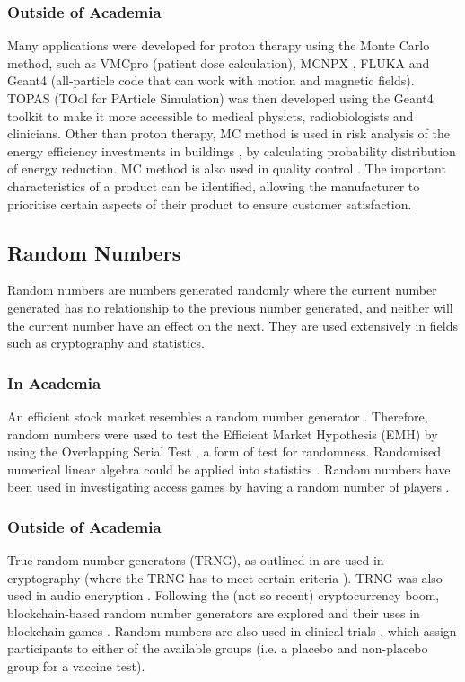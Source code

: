\documentclass[10pt, twocolumn]{article}
\begin{document}
\subsubsection{Outside of Academia} %
Many applications were developed for proton therapy using the Monte Carlo method, such as VMCpro \cite{FippelSoukup2004} (patient dose calculation), MCNPX \cite{Waters2002}, FLUKA \cite{Ferrari2005} and Geant4 \cite{Geant4} \cite{Geant4_2} (all-particle code that can work with motion and magnetic fields). TOPAS (TOol for PArticle Simulation) \cite{Perl2012}\cite{Faddegon2020} was then developed using the Geant4 toolkit to make it more accessible to medical physicts, radiobiologists and clinicians. Other than proton therapy, MC method is used in risk analysis of the energy efficiency investments in buildings \cite{Togashi2019}, by calculating probability distribution of energy reduction. MC method is also used in quality control \cite{Moran2023}. The important characteristics of a product can be identified, allowing the manufacturer to prioritise certain aspects of their product to ensure customer satisfaction.

\subsection{Random Numbers} %
Random numbers are numbers generated randomly where the current number generated has no relationship to the previous number generated, and neither will the current number have an effect on the next. They are used extensively in fields such as cryptography and statistics.

\subsubsection{In Academia}
An efficient stock market resembles a random number generator \cite{Doyle2013}. Therefore, random numbers were used to test the Efficient Market Hypothesis (EMH) \cite{Yen2008} by using the Overlapping Serial Test \cite{Good1953}, a form of test for randomness. Randomised numerical linear algebra \cite{Martinsson2020} could be applied into statistics \cite{Gentle2012}. Random numbers have been used in investigating access games by having a random number of players \cite{Tembine2008}.

\subsubsection{Outside of Academia} %
True random number generators (TRNG), as outlined in \cite{Sunar2009} are used in cryptography (where the TRNG has to meet certain criteria \cite{Latham2001}). TRNG was also used in audio encryption \cite{Etem2020}. Following the (not so recent) cryptocurrency boom, blockchain-based random number generators \cite{Hsieh2022} are explored and their uses in blockchain games \cite{Du2019}. Random numbers are also used in clinical trials \cite{Beller2002}, which assign participants to either of the available groups (i.e. a placebo and non-placebo group for a vaccine test).
\end{document}
